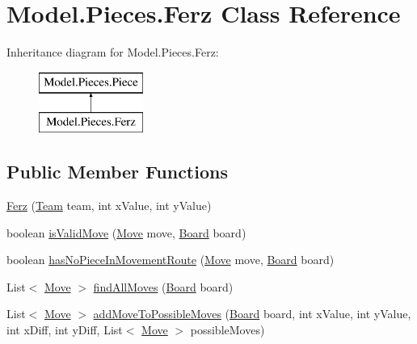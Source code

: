 \hypertarget{class_model_1_1_pieces_1_1_ferz}{}\section{Model.\+Pieces.\+Ferz Class Reference}
\label{class_model_1_1_pieces_1_1_ferz}
Inheritance diagram for Model.\+Pieces.\+Ferz\+:\begin{figure}[H]
\begin{center}
\leavevmode
\includegraphics[height=2.000000cm]{class_model_1_1_pieces_1_1_ferz}
\end{center}
\end{figure}
\subsection*{Public Member Functions}
\begin{DoxyCompactItemize}
\item 
\hyperlink{class_model_1_1_pieces_1_1_ferz_a67c4619c704f514b56bfee13b922ef7b}{Ferz} (\hyperlink{class_model_1_1_team}{Team} team, int x\+Value, int y\+Value)
\item 
boolean \hyperlink{class_model_1_1_pieces_1_1_ferz_a0251ed6241fd3884b7f192659f44a9bd}{is\+Valid\+Move} (\hyperlink{class_model_1_1_move}{Move} move, \hyperlink{class_model_1_1_board}{Board} board)
\item 
boolean \hyperlink{class_model_1_1_pieces_1_1_ferz_a71d7e41b8171d621ce3f2f83791fbdc5}{has\+No\+Piece\+In\+Movement\+Route} (\hyperlink{class_model_1_1_move}{Move} move, \hyperlink{class_model_1_1_board}{Board} board)
\item 
List$<$ \hyperlink{class_model_1_1_move}{Move} $>$ \hyperlink{class_model_1_1_pieces_1_1_ferz_a86f35019ec569ae71b9c1d8a3e390df8}{find\+All\+Moves} (\hyperlink{class_model_1_1_board}{Board} board)
\item 
List$<$ \hyperlink{class_model_1_1_move}{Move} $>$ \hyperlink{class_model_1_1_pieces_1_1_ferz_a8359fecbb4158e2e00efcd1561e86177}{add\+Move\+To\+Possible\+Moves} (\hyperlink{class_model_1_1_board}{Board} board, int x\+Value, int y\+Value, int x\+Diff, int y\+Diff, List$<$ \hyperlink{class_model_1_1_move}{Move} $>$ possible\+Moves)
\end{DoxyCompactItemize}


